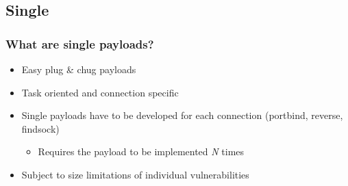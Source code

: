 \documentclass{beamer}
\newenvironment{sitemize}{\vspace{1mm}\begin{itemize}\itemsep 4pt\small}{\end{itemize}}
\begin{document}
\subsection{Single}

\begin{frame}[t]
    \frametitle{What are single payloads?}

    \begin{sitemize}
        \item Easy plug \& chug payloads

        \pause
        \item Task oriented and connection specific

        \pause
        \item Single payloads have to be developed for each
            connection (portbind, reverse, findsock)
        \begin{sitemize}
            \item Requires the payload to be implemented \textit{N} times
        \end{sitemize}

        \pause
        \item Subject to size limitations of individual
        vulnerabilities
    \end{sitemize}
\end{frame}

\end{document}
